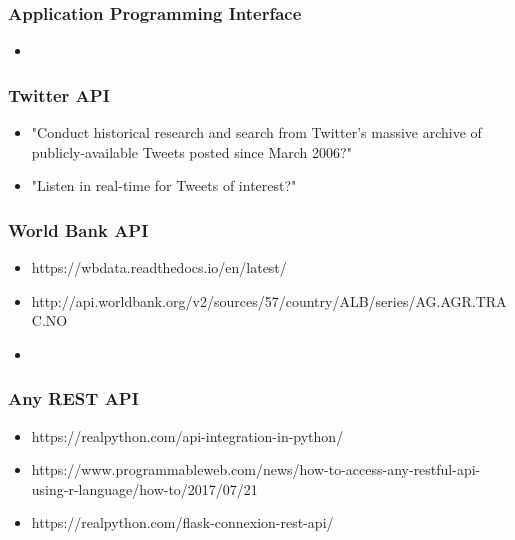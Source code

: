 
\begin{frame}
    \frametitle{Application Programming Interface}
    \begin{itemize}
        \item
    \end{itemize}
\end{frame}

\begin{frame}
    \frametitle{Twitter API}
    \begin{itemize}
        \item "Conduct historical research and search from Twitter's massive
        archive of publicly-available Tweets posted since March 2006?"
        \item "Listen in real-time for Tweets of interest?"
    \end{itemize}
\end{frame}

\begin{frame}
    \frametitle{World Bank API}
    \begin{itemize}
        \item https://wbdata.readthedocs.io/en/latest/
        \item http://api.worldbank.org/v2/sources/57/country/ALB/series/AG.AGR.TRAC.NO
        \item
    \end{itemize}
\end{frame}

\begin{frame}
    \frametitle{Any REST API}
    \begin{itemize}
        \item https://realpython.com/api-integration-in-python/
        \item https://www.programmableweb.com/news/how-to-access-any-restful-api-using-r-language/how-to/2017/07/21
        \item https://realpython.com/flask-connexion-rest-api/
    \end{itemize}

\end{frame}
